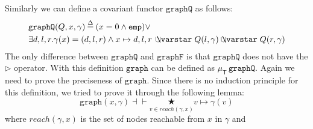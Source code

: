 Similarly we can define a covariant functor $\mathtt{graphQ}$ as
follows:
\[\label{eqn:graphFco}
  \begin{split}
  & \mathtt{graphQ}(Q, x, \gamma)\defeq (x = 0 \wedge
  \mathtt{emp}) \vee \\ & \exists d,l,r . \gamma(x)=(d,l,r) \wedge  x
  \mapsto d,l,r\, \ocon Q(l, \gamma) \ocon Q(r, \gamma)
  \end{split}
\]
The only difference between $\mathtt{graphQ}$ and $\mathtt{graphF}$ is
that $\mathtt{graphQ}$ does not have the $\triangleright$
operator. With this definition $\mathtt{graph}$ can be defined as
$\mu_{\mathsf{T}}\,\mathtt{graphQ}$. Again we need to prove the
preciseness of $\mathtt{graph}$. Since there is no induction principle
for this definition, we tried to prove it through the following lemma:
\begin{equation}\label{eqn:graph_iter}
\mathtt{graph}(x, \gamma) \dashv\vdash
\underset{v\in\mathit{reach}(\gamma, x)}{\bigstar} v\mapsto\gamma(v)
\end{equation}
where $\mathit{reach}(\gamma, x)$ is the set of nodes reachable from
$x$ in $\gamma$ and 